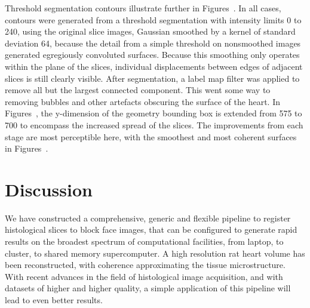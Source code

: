 	Threshold segmentation contours illustrate further in Figures~. In all cases, contours were generated from a threshold segmentation with intensity limits 0 to 240, using the original slice images, Gaussian smoothed by a kernel of standard deviation 64, because the detail from a simple threshold on nonsmoothed images generated egregiously convoluted surfaces. Because this smoothing only operates within the plane of the slices, individual displacements between edges of adjacent slices is still clearly visible. After segmentation, a label map filter was applied to remove all but the largest connected component. This went some way to removing bubbles and other artefacts obscuring the surface of the heart. In Figures~, the y-dimension of the geometry bounding box is extended from 575 to 700 to encompass the increased spread of the slices. The improvements from each stage are most perceptible here, with the smoothest and most coherent surfaces in Figures~.
	

\section{Discussion} %
\label{sec:discussion}
  We have constructed a comprehensive, generic and flexible pipeline to register histological slices to block face images, that can be configured to generate rapid results on the broadest spectrum of computational facilities, from laptop, to cluster, to shared memory supercomputer. A high resolution rat heart volume has been reconstructed, with coherence approximating the tissue microstructure. With recent advances in the field of histological image acquisition, and with datasets of higher and higher quality, a simple application of this pipeline will lead to even better results.
	
